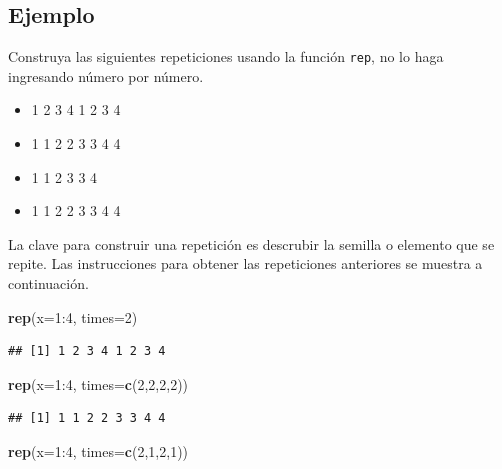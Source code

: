 \documentclass[10pt,]{krantz}
\makeatletter
\newenvironment{Shaded}{\begin{snugshade}}{\end{snugshade}}
\newcommand{\KeywordTok}[1]{\textcolor[rgb]{0.13,0.29,0.53}{\textbf{{#1}}}}
\newcommand{\DataTypeTok}[1]{\textcolor[rgb]{0.13,0.29,0.53}{{#1}}}
\newcommand{\DecValTok}[1]{\textcolor[rgb]{0.00,0.00,0.81}{{#1}}}
\newcommand{\NormalTok}[1]{{#1}}
\providecommand{\tightlist}{%
  \setlength{\itemsep}{0pt}\setlength{\parskip}{0pt}}
\newenvironment{kframe}{%
\medskip{}
\setlength{\fboxsep}{.8em}
 \def\at@end@of@kframe{}%
 \ifinner\ifhmode%
  \def\at@end@of@kframe{\end{minipage}}%
  \begin{minipage}{\columnwidth}%
 \fi\fi%
 \def\FrameCommand##1{\hskip\@totalleftmargin \hskip-\fboxsep
 \colorbox{shadecolor}{##1}\hskip-\fboxsep
     \hskip-\linewidth \hskip-\@totalleftmargin \hskip\columnwidth}%
 \MakeFramed {\advance\hsize-\width
   \@totalleftmargin\z@ \linewidth\hsize
   \@setminipage}}%
 {\par\unskip\endMakeFramed%
 \at@end@of@kframe}
\renewenvironment{Shaded}{\begin{kframe}}{\end{kframe}}
\makeatother
\begin{document}
\subsection*{Ejemplo}\label{ejemplo-17}


Construya las siguientes repeticiones usando la función \texttt{rep}, no
lo haga ingresando número por número.

\begin{itemize}
\tightlist
\item
  1 2 3 4 1 2 3 4
\item
  1 1 2 2 3 3 4 4
\item
  1 1 2 3 3 4
\item
  1 1 2 2 3 3 4 4
\end{itemize}

La clave para construir una repetición es descrubir la semilla o
elemento que se repite. Las instrucciones para obtener las repeticiones
anteriores se muestra a continuación.

\begin{Shaded}
\begin{Highlighting}[]
\KeywordTok{rep}\NormalTok{(}\DataTypeTok{x=}\DecValTok{1}\NormalTok{:}\DecValTok{4}\NormalTok{, }\DataTypeTok{times=}\DecValTok{2}\NormalTok{)}
\end{Highlighting}
\end{Shaded}

\begin{verbatim}
## [1] 1 2 3 4 1 2 3 4
\end{verbatim}

\begin{Shaded}
\begin{Highlighting}[]
\KeywordTok{rep}\NormalTok{(}\DataTypeTok{x=}\DecValTok{1}\NormalTok{:}\DecValTok{4}\NormalTok{, }\DataTypeTok{times=}\KeywordTok{c}\NormalTok{(}\DecValTok{2}\NormalTok{,}\DecValTok{2}\NormalTok{,}\DecValTok{2}\NormalTok{,}\DecValTok{2}\NormalTok{))}
\end{Highlighting}
\end{Shaded}

\begin{verbatim}
## [1] 1 1 2 2 3 3 4 4
\end{verbatim}

\begin{Shaded}
\begin{Highlighting}[]
\KeywordTok{rep}\NormalTok{(}\DataTypeTok{x=}\DecValTok{1}\NormalTok{:}\DecValTok{4}\NormalTok{, }\DataTypeTok{times=}\KeywordTok{c}\NormalTok{(}\DecValTok{2}\NormalTok{,}\DecValTok{1}\NormalTok{,}\DecValTok{2}\NormalTok{,}\DecValTok{1}\NormalTok{))}
\end{Highlighting}
\end{Shaded}
\end{document}
